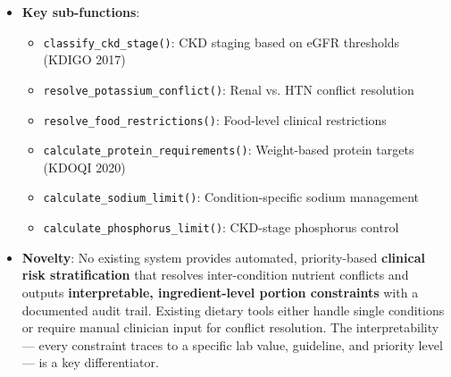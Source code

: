 \documentclass[a4paper,12pt]{article}
\begin{document}
\begin{itemize}[itemsep=0.3em]
    \item \textbf{Key sub-functions}:
    \begin{itemize}
        \item \texttt{classify\_ckd\_stage()}: CKD staging based on eGFR thresholds (KDIGO 2017)
        \item \texttt{resolve\_potassium\_conflict()}: Renal vs. HTN conflict resolution
        \item \texttt{resolve\_food\_restrictions()}: Food-level clinical restrictions
        \item \texttt{calculate\_protein\_requirements()}: Weight-based protein targets (KDOQI 2020)
        \item \texttt{calculate\_sodium\_limit()}: Condition-specific sodium management
        \item \texttt{calculate\_phosphorus\_limit()}: CKD-stage phosphorus control
    \end{itemize}

    \item \textbf{Novelty}: No existing system provides automated, priority-based \textbf{clinical risk stratification} that resolves inter-condition nutrient conflicts and outputs \textbf{interpretable, ingredient-level portion constraints} with a documented audit trail. Existing dietary tools either handle single conditions or require manual clinician input for conflict resolution. The interpretability --- every constraint traces to a specific lab value, guideline, and priority level --- is a key differentiator.
\end{itemize}
\end{document}
